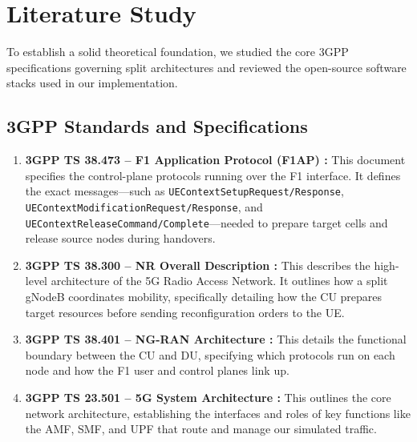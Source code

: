 \section{Literature Study}
\justify
To establish a solid theoretical foundation, we studied the core 3GPP specifications governing split architectures and reviewed the open-source software stacks used in our implementation.

\subsection{3GPP Standards and Specifications}
\begin{enumerate}[leftmargin=*]
    \item \textbf{3GPP TS 38.473 -- F1 Application Protocol (F1AP) \cite{3gpp_ts38473}:} This document specifies the control-plane protocols running over the F1 interface. It defines the exact messages---such as \texttt{UEContextSetupRequest/Response}, \texttt{UEContextModificationRequest/Response}, and \texttt{UEContextReleaseCommand/Complete}---needed to prepare target cells and release source nodes during handovers.
    
    \item \textbf{3GPP TS 38.300 -- NR Overall Description \cite{3gpp_ts38300}:} This describes the high-level architecture of the 5G Radio Access Network. It outlines how a split gNodeB coordinates mobility, specifically detailing how the CU prepares target resources before sending reconfiguration orders to the UE.
    
    \item \textbf{3GPP TS 38.401 -- NG-RAN Architecture \cite{3gpp_ts38401}:} This details the functional boundary between the CU and DU, specifying which protocols run on each node and how the F1 user and control planes link up.
    
    \item \textbf{3GPP TS 23.501 -- 5G System Architecture \cite{3gpp_ts23501}:} This outlines the core network architecture, establishing the interfaces and roles of key functions like the AMF, SMF, and UPF that route and manage our simulated traffic.
\end{enumerate}

